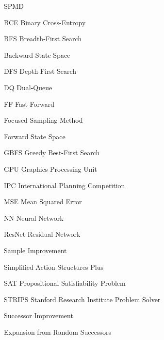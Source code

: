 \documentclass[ppgc,diss,english]{iiufrgs}
\begin{document}
\begin{listofabbrv}{SPMD}
        \item[BCE] Binary Cross-Entropy
        \item[BFS] Breadth-First Search
        \item[\bsp] Backward State Space
        \item[DFS] Depth-First Search
        \item[DQ] Dual-Queue
        \item[FF] Fast-Forward
        \item[\bfsrw] Focused Sampling Method
        \item[\fsp] Forward State Space
        \item[GBFS] Greedy Best-First Search
        \item[GPU] Graphics Processing Unit
        \item[IPC] International Planning Competition
        \item[MSE] Mean Squared Error
        \item[NN]  Neural Network
        \item[ResNet] Residual Network
        \item[\sai] Sample Improvement
        \item[\sas] Simplified Action Structures Plus
        \item[SAT] Propositional Satisfiability Problem
        \item[STRIPS] Stanford Research Institute Problem Solver
        \item[\sui] Successor Improvement
        \item[\bfsrs] Expansion from Random Successors
\end{listofabbrv}
\end{document}
